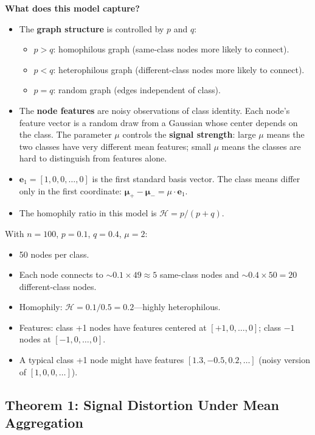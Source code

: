 \documentclass[11pt,a4paper]{article}
\theoremstyle{definition}
\theoremstyle{plain}
\begin{document}
\textbf{What does this model capture?}
\begin{itemize}
  \item The \textbf{graph structure} is controlled by $p$ and $q$:
    \begin{itemize}[nosep]
      \item $p > q$: homophilous graph (same-class nodes more likely to connect).
      \item $p < q$: heterophilous graph (different-class nodes more likely to connect).
      \item $p = q$: random graph (edges independent of class).
    \end{itemize}
  \item The \textbf{node features} are noisy observations of class identity.
    Each node's feature vector is a random draw from a Gaussian whose center
    depends on the class. The parameter $\mu$ controls the \textbf{signal
    strength}: large $\mu$ means the two classes have very different mean features;
    small $\mu$ means the classes are hard to distinguish from features alone.
  \item $\mathbf{e}_1 = [1, 0, 0, \ldots, 0]$ is the first standard basis vector.
    The class means differ only in the first coordinate: $\boldsymbol{\mu}_+ -
    \boldsymbol{\mu}_- = \mu \cdot \mathbf{e}_1$.
  \item The homophily ratio in this model is $\mathcal{H} = p/(p+q)$.
\end{itemize}

\begin{example}
With $n = 100$, $p = 0.1$, $q = 0.4$, $\mu = 2$:
\begin{itemize}[nosep]
  \item 50 nodes per class.
  \item Each node connects to $\sim 0.1 \times 49 \approx 5$ same-class nodes
    and $\sim 0.4 \times 50 = 20$ different-class nodes.
  \item Homophily: $\mathcal{H} = 0.1/0.5 = 0.2$---highly heterophilous.
  \item Features: class +1 nodes have features centered at $[+1, 0, \ldots, 0]$;
    class $-1$ nodes at $[-1, 0, \ldots, 0]$.
  \item A typical class +1 node might have features $[1.3, -0.5, 0.2, \ldots]$
    (noisy version of $[1, 0, 0, \ldots]$).
\end{itemize}
\end{example}


\subsection{Theorem 1: Signal Distortion Under Mean Aggregation}
\label{sec:theorem1}
\end{document}
